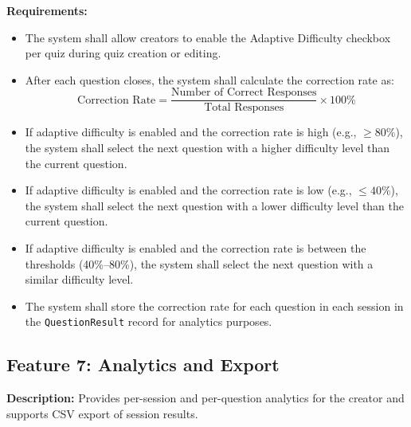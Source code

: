 \documentclass[12pt,a4paper]{article}
\begin{document}
\textbf{Requirements:}
\begin{itemize}
  \item[\textbf{FR41:}] The system shall allow creators to enable the Adaptive
        Difficulty checkbox per quiz during quiz creation or editing.
  \item[\textbf{FR42:}] After each question closes, the system shall calculate the
        correction rate as:
        \[
          \text{Correction Rate} = \frac{\text{Number of Correct Responses}}
                                        {\text{Total Responses}} \times 100\%
        \]
  \item[\textbf{FR43:}] If adaptive difficulty is enabled and the correction rate is
        high (e.g., $\geq 80\%$), the system shall select the next question with a
        higher difficulty level than the current question.
  \item[\textbf{FR44:}] If adaptive difficulty is enabled and the correction rate is
        low (e.g., $\leq 40\%$), the system shall select the next question with a
        lower difficulty level than the current question.
  \item[\textbf{FR45:}] If adaptive difficulty is enabled and the correction rate is
        between the thresholds (40\%--80\%), the system shall select the next question
        with a similar difficulty level.
  \item[\textbf{FR46:}] The system shall store the correction rate for each question
        in each session in the \texttt{QuestionResult} record for analytics purposes.
\end{itemize}

\subsection{Feature 7: Analytics and Export}
\textbf{Description:} Provides per-session and per-question analytics for the creator
and supports CSV export of session results.
\end{document}
